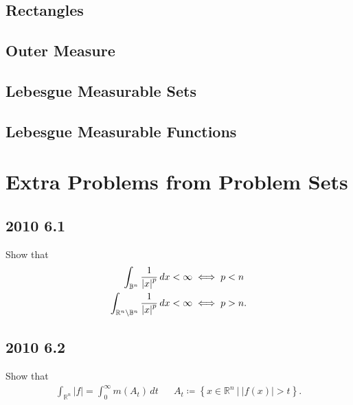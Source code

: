\hypertarget{rectangles}{%
\subsection{Rectangles}\label{rectangles}}

\hypertarget{outer-measure-1}{%
\subsection{Outer Measure}\label{outer-measure-1}}

\hypertarget{lebesgue-measurable-sets}{%
\subsection{Lebesgue Measurable Sets}\label{lebesgue-measurable-sets}}

\hypertarget{lebesgue-measurable-functions}{%
\subsection{Lebesgue Measurable
Functions}\label{lebesgue-measurable-functions}}

\hypertarget{extra-problems-from-problem-sets}{%
\section{Extra Problems from Problem
Sets}\label{extra-problems-from-problem-sets}}

\hypertarget{section}{%
\subsection{2010 6.1}\label{section}}

Show that
\begin{align*}
\int_{{\mathbb{B}}^n} {1 \over {\left\lvert {x} \right\rvert}^p } \,dx&< \infty \iff p < n \\
\int_{{\mathbb{R}}^n\setminus{\mathbb{B}}^n} {1 \over {\left\lvert {x} \right\rvert}^p } \,dx&< \infty \iff p > n 
.\end{align*}

\hypertarget{section-1}{%
\subsection{2010 6.2}\label{section-1}}

Show that
\begin{align*}
\int_{{\mathbb{R}}^n} {\left\lvert { f} \right\rvert} = \int_0^{\infty } m(A_t)\,dt&& A_t \coloneqq\left\{{x\in {\mathbb{R}}^n {~\mathrel{\Big|}~}{\left\lvert {f(x)} \right\rvert} > t}\right\}
.\end{align*}

